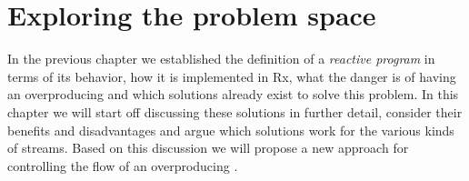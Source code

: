\chapter{Exploring the problem space}
\label{chap:exploring-the-problem-space}
In the previous chapter we established the definition of a \textit{reactive program} in terms of its behavior, how it is implemented in Rx, what the danger is of having an overproducing \obs and which solutions already exist to solve this problem. In this chapter we will start off discussing these solutions in further detail, consider their benefits and disadvantages and argue which solutions work for the various kinds of streams. Based on this discussion we will propose a new approach for controlling the flow of an overproducing \obs.





